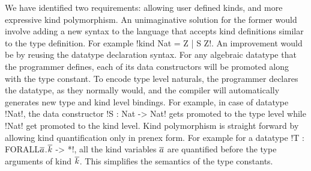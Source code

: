 \documentclass[screen,nonacm,manuscript,review]{acmart} %
\begin{document}
We have identified two requirements: allowing user defined kinds, and
more expressive kind polymorphism. An unimaginative solution for the former would involve adding a new syntax to the language that accepts kind definitions similar to the type definition. For example !kind Nat = Z | S Z!. An improvement would be by reusing the datatype declaration syntax. For any algebraic datatype that the programmer defines, each of its data constructors will be promoted along with the type constant. To encode type level naturals, the programmer declares the datatype, as they normally would, and the compiler will automatically generates new type and kind level bindings. For example, in case of datatype !Nat!, the data constructor !S : Nat -> Nat! gets promoted to the type level while !Nat! get promoted to the kind level. Kind polymorphism is straight forward by allowing kind quantification only in prenex form. For example for a datatype !T : FORALL$\overline{a}$.$\overline{k}$ -> *!, all the kind variables $\overline{a}$ are quantified before the type arguments of kind $\overline{k}$. This simplifies the semantics of the type constants.
\end{document}
